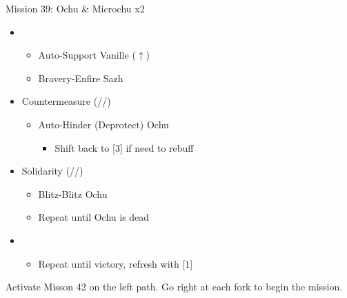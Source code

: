 \renewcommand{\first}{[1] Solidarity (\com/\sen/\med)}
\renewcommand{\fifth}{[5] Countermeasure (\sab/\sen/\sab)}

\begin{battle}{Mission 39: Ochu \& Microchu x2}
	\begin{itemize}
		\item \third
			\begin{itemize}
				\item Auto-Support Vanille ($\uparrow$)
				\item Bravery-Enfire Sazh
			\end{itemize}
		\item \fifth
			\begin{itemize}
				\item Auto-Hinder (Deprotect) Ochu
					\begin{itemize}
						\item Shift back to [3] if need to rebuff
					\end{itemize}
			\end{itemize}
		\item \first
			\begin{itemize}
				\item Blitz-Blitz Ochu
				\item Repeat until Ochu is dead
			\end{itemize}
		\item \second
			\begin{itemize}
				\item Repeat until victory, refresh with [1]
			\end{itemize}												
	\end{itemize}
\end{battle}

Activate Misson 42 on the left path.
Go right at each fork to begin the mission.

